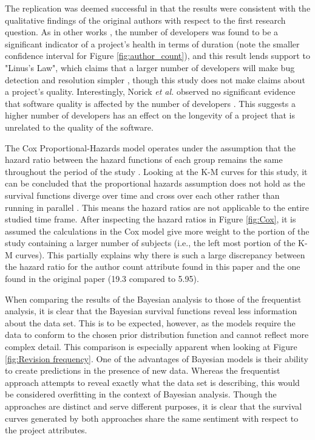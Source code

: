 \documentclass[sigconf]{acmart}
\begin{document}
The replication was deemed successful in that the results were consistent with the qualitative findings of the original authors with respect to the first research question.
As in other works \cite{samoladas2010survival}, the number of developers was found to be a significant indicator of a project's health in terms of duration (note the smaller confidence interval for Figure \ref{fig:author_count}), and this result lends support to "Linus's Law", which claims that a larger number of developers will make bug detection and resolution simpler \cite{raymond2001LinusLaw}, though this study does not make claims about a project's quality.
Interestingly, Norick \emph{et al.} observed no significant evidence that software quality is affected by the number of developers \cite{norick2010effects}.
This suggests a higher number of developers has an effect on the longevity of a project that is unrelated to the quality of the software.

The Cox Proportional-Hazards model operates under the assumption that the hazard ratio between the hazard functions of each group remains the same throughout the period of the study \cite{stel2011cox}.
Looking at the K-M curves for this study, it can be concluded that the proportional hazards assumption does not hold as the survival functions diverge over time and cross over each other rather than running in parallel \cite{persson2007ACO}.
This means the hazard ratios are not applicable to the entire studied time frame.
After inspecting the hazard ratios in Figure \ref{fig:Cox}, it is assumed the calculations in the Cox model give more weight to the portion of the study containing a larger number of subjects (i.e., the left most portion of the K-M curves).
This partially explains why there is such a large discrepancy between the hazard ratio for the author count attribute found in this paper and the one found in the original paper (19.3 compared to 5.95).

When comparing the results of the Bayesian analysis to those of the frequentist analysis, it is clear that the Bayesian survival functions reveal less information about the data set.
This is to be expected, however, as the models require the data to conform to the chosen prior distribution function and cannot reflect more complex detail.
This comparison is especially apparent when looking at Figure \ref{fig:Revision frequency}.
One of the advantages of Bayesian models is their ability to create predictions in the presence of new data.
Whereas the frequentist approach attempts to reveal exactly what the data set is describing, this would be considered overfitting in the context of Bayesian analysis.
Though the approaches are distinct and serve different purposes, it is clear that the survival curves generated by both approaches share the same sentiment with respect to the project attributes.
\end{document}
